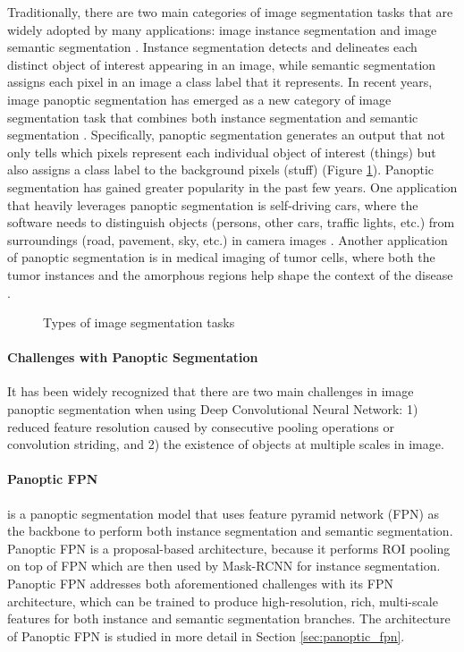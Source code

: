 \documentclass[10pt,twocolumn,letterpaper]{article}
\begin{document}
Traditionally, there are two main categories of image segmentation tasks that are widely adopted by many applications: image instance segmentation \cite{hafiz2020survey} and image semantic segmentation \cite{asgari2021deep}. Instance segmentation detects and delineates each distinct object of interest appearing in an image, while semantic segmentation assigns each pixel in an image a class label that it represents. In recent years, image panoptic segmentation has emerged as a new category of image segmentation task that combines both instance segmentation and semantic segmentation \cite{elharrouss2021panoptic}. Specifically, panoptic segmentation generates an output that not only tells which pixels represent each individual object of interest (things) but also assigns a class label to the background pixels (stuff) (Figure \ref{fig:segmentation_types}). Panoptic segmentation has gained greater popularity in the past few years. One application that heavily leverages panoptic segmentation is self-driving cars, where the software needs to distinguish objects (persons, other cars, traffic lights, etc.) from surroundings (road, pavement, sky, etc.) in camera images \cite{behley2021benchmark}. Another application of panoptic segmentation is in medical imaging of tumor cells, where both the tumor instances and the amorphous regions help shape the context of the disease \cite{zhang2018panoptic,cha2021panoptic}.


\begin{figure}[htbp]
\centering
{}
\caption{Types of image segmentation tasks}
\label{fig:segmentation_types}
\end{figure}

\paragraph{Challenges with Panoptic Segmentation} It has been widely recognized that there are two main challenges in image panoptic segmentation when using Deep Convolutional Neural Network: 1) reduced feature resolution caused by consecutive pooling operations or convolution striding, and 2) the existence of objects at multiple scales in image.


\paragraph{Panoptic FPN} is a panoptic segmentation model that uses feature pyramid network (FPN) as the backbone to perform both instance segmentation and semantic segmentation. Panoptic FPN is a proposal-based architecture, because it performs ROI pooling on top of FPN which are then used by Mask-RCNN for instance segmentation. Panoptic FPN addresses both aforementioned challenges with its FPN architecture, which can be trained to produce high-resolution, rich, multi-scale features for both instance and semantic segmentation branches. The architecture of Panoptic FPN is studied in more detail in Section \ref{sec:panoptic_fpn}.
\end{document}
